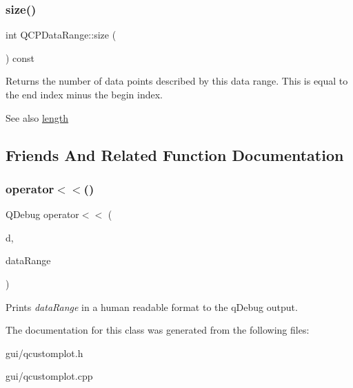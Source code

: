 \subsubsection{\texorpdfstring{size()}{size()}}
{\footnotesize\ttfamily int Q\+C\+P\+Data\+Range\+::size (\begin{DoxyParamCaption}{ }\end{DoxyParamCaption}) const\hspace{0.3cm}{\ttfamily [inline]}}

Returns the number of data points described by this data range. This is equal to the end index minus the begin index.

\begin{DoxySeeAlso}{See also}
\hyperlink{classQCPDataRange_a1e7836058f755c6ab9f11996477b7150}{length} 
\end{DoxySeeAlso}


\subsection{Friends And Related Function Documentation}
\mbox{\label{classQCPDataRange_a486dd7af8a090ed069672e3510e6a082}} 
\subsubsection{\texorpdfstring{operator$<$$<$()}{operator<<()}}
{\footnotesize\ttfamily Q\+Debug operator$<$$<$ (\begin{DoxyParamCaption}\item[{Q\+Debug}]{d,  }\item[{const \hyperlink{classQCPDataRange}{Q\+C\+P\+Data\+Range} \&}]{data\+Range }\end{DoxyParamCaption})\hspace{0.3cm}{\ttfamily [related]}}

Prints {\itshape data\+Range} in a human readable format to the q\+Debug output. 

The documentation for this class was generated from the following files\+:\begin{DoxyCompactItemize}
\item 
gui/qcustomplot.\+h\item 
gui/qcustomplot.\+cpp\end{DoxyCompactItemize}
